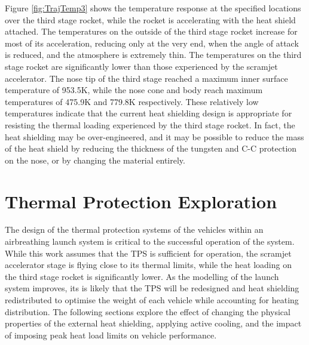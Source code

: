 Figure \ref{fig:TrajTemp3} shows the temperature response at the specified locations over the third stage rocket, while the rocket is accelerating with the heat shield attached. The temperatures on the outside of the third stage rocket increase for most of its acceleration, reducing only at the very end, when the angle of attack is reduced, and the atmosphere is extremely thin. 
The temperatures on the third stage rocket are significantly lower than those experienced by the scramjet accelerator. The nose tip of the third stage reached a maximum inner surface temperature of 953.5K, while the nose cone and body reach maximum temperatures of 475.9K and 779.8K respectively. These relatively low temperatures indicate that the current heat shielding design is appropriate for resisting the thermal loading experienced by the third stage rocket. In fact, the heat shielding may be over-engineered, and it may be possible to reduce the mass of the heat shield by reducing the thickness of the tungsten and C-C protection on the nose, or by changing the material entirely. 










\section{Thermal Protection Exploration}

The design of the thermal protection systems of the vehicles within an airbreathing launch system is critical to the successful operation of the system. While this work assumes that the TPS is sufficient for operation, the scramjet accelerator stage is flying close to its thermal limits, while the heat loading on the third stage rocket is significantly lower. 
As the modelling of the launch system improves, its is likely that the TPS will be redesigned and heat shielding redistributed to optimise the weight of each vehicle while accounting for heating distribution. The following sections explore the effect of changing the physical properties of the external heat shielding, applying active cooling, and the impact of imposing peak heat load limits on vehicle performance. 

